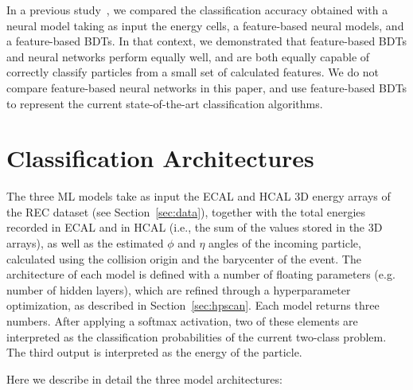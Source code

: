 In a previous study~\cite{NIPS}, we compared the classification accuracy obtained with a neural model taking as input the energy cells, a feature-based neural models, and a feature-based BDTs. In that context, we demonstrated that feature-based BDTs and neural networks perform equally well, and are both equally capable of correctly classify particles from a small set of calculated features. 
We do not compare feature-based neural networks in this paper, and use feature-based BDTs to represent the current state-of-the-art classification algorithms.

\section{Classification Architectures}

The three ML models take as input the ECAL and HCAL 3D energy arrays of the REC dataset (see Section~\ref{sec:data}), together with the total energies recorded in ECAL and in HCAL (i.e., the sum of the values stored in the 3D arrays), as well as the estimated $\phi$ and $\eta$ angles of the incoming particle, calculated using the collision origin and the barycenter of the event. The architecture of each model is defined with a number of floating parameters (e.g. number of hidden layers), which are refined through a hyperparameter optimization, as described in Section~\ref{sec:hpscan}. Each model returns three numbers. After applying a softmax activation, two of these elements are interpreted as the classification probabilities of the current two-class problem. The third output is interpreted as the energy of the particle.

Here we describe in detail the three model architectures:

